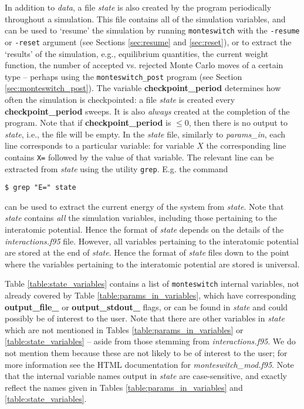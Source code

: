 \documentclass{report}
\begin{document}
In addition to \emph{data}, a file \emph{state} is also created by the program periodically throughout a simulation. This file contains all of the 
simulation variables, and can be used to `resume' the simulation by running \texttt{monteswitch} with the \texttt{-resume} or \texttt{-reset} argument
(see Sections \ref{sec:resume} and \ref{sec:reset}), or to extract the `results' of the simulation, e.g., equilibrium quantities, the current weight 
function, the number of accepted vs. rejected Monte Carlo moves of a certain type -- perhaps using the \texttt{monteswitch\_post} program 
(see Section \ref{sec:monteswitch_post}).
The variable \textbf{checkpoint\_period} determines how often the simulation is checkpointed: a file \emph{state} is created every 
\textbf{checkpoint\_period} sweeps. It is also \emph{always} created at the completion of the program. Note that if \textbf{checkpoint\_period} is $\leq 0$, 
then there is no output to \emph{state}, i.e., the file will be empty.
In the \emph{state} file, similarly to \emph{params\_in}, each line corresponds to a particular variable: for variable $X$ the corresponding line contains
\texttt{X=} followed by the value of that variable. The relevant line can be extracted from \emph{state} using the utility \texttt{grep}. E.g. the command
\begin{verbatim}
$ grep "E=" state
\end{verbatim}
can be used to extract the current energy of the system from \emph{state}.
Note that \emph{state} contains \emph{all} the simulation variables, including those
pertaining to the interatomic potential. Hence the format of \emph{state} depends on the details of the \emph{interactions.f95} file. However,
all variables pertaining to the interatomic potential are stored at the end of \emph{state}. Hence the format of \emph{state} files down to the
point where the variables pertaining to the interatomic potential are stored is universal.

Table \ref{table:state_variables} contains a list of \texttt{monteswitch} internal variables, not already covered by Table \ref{table:params_in_variables},
which have corresponding \textbf{output\_file\_} or \textbf{output\_stdout\_} flags, or can be found in \emph{state} and could possibly be of interest
to the user. Note that there are other variables in \emph{state} which are not mentioned in Tables \ref{table:params_in_variables} or 
\ref{table:state_variables} -- aside from those stemming from \emph{interactions.f95}. We do not mention them because these are not likely to be of
interest to the user; for more information see the HTML documentation for \emph{monteswitch\_mod.f95}.
Note that the internal variable names output in \emph{state} are case-sensitive, and exactly reflect the names given in Tables 
\ref{table:params_in_variables} and \ref{table:state_variables}.
\end{document}
